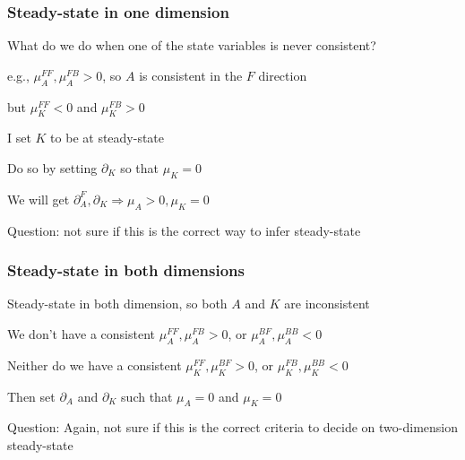 \documentclass[aspectratio=169]{beamer}
\newenvironment{wideitemize}{\itemize\addtolength{\itemsep}{10pt}}{\enditemize}
\begin{document}
\begin{frame}
    \frametitle{Steady-state in one dimension}

    \begin{wideitemize}
        \item What do we do when one of the state variables is never consistent?
        \item e.g., $\mu_A^{FF}, \mu_A^{FB} > 0$, so $A$ is consistent in the $F$ direction
        \item but $\mu_K^{FF} < 0$ and $\mu_K^{FB} > 0$
        \item I set $K$ to be at steady-state
        \item Do so by setting $\partial_K$ so that $\mu_K = 0$
        \item We will get $\partial_A^F, \partial_K \Rightarrow \mu_A > 0, \mu_K = 0$
        \item Question: not sure if this is the correct way to infer steady-state
    \end{wideitemize}

\end{frame}

\begin{frame}
    \frametitle{Steady-state in both dimensions}

    \begin{wideitemize}
        \item Steady-state in both dimension, so both $A$ and $K$ are inconsistent
        \item We don't have a consistent $\mu_A^{FF}, \mu_A^{FB} > 0$, or $\mu_A^{BF}, \mu_A^{BB} < 0$
        \item Neither do we have a consistent $\mu_K^{FF}, \mu_K^{BF} > 0$, or $\mu_K^{FB}, \mu_K^{BB} < 0$
        \item Then set $\partial_A$ and $\partial_K$ such that $\mu_A = 0$ and $\mu_K = 0$
        \item Question: Again, not sure if this is the correct criteria to decide on two-dimension steady-state
    \end{wideitemize}

\end{frame}
\end{document}
